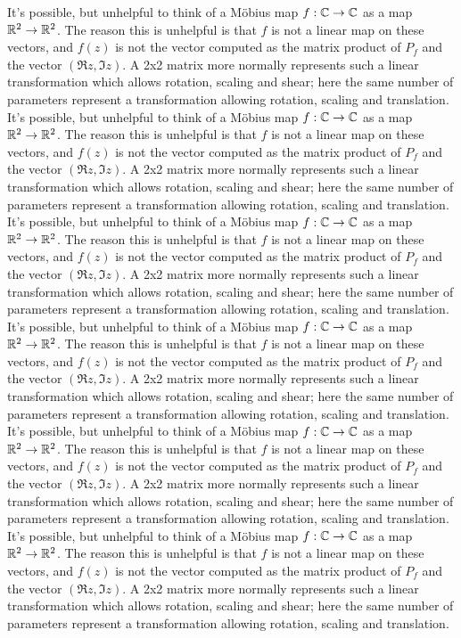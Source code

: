 It's possible, but unhelpful to think of a M\"obius map $f:\mathbb{C}\rightarrow\mathbb{C}$ as a  map $\mathbb{R}^2\rightarrow\mathbb{R}^2$.  The reason this is unhelpful is that $f$ is not a linear map on these vectors, and $f(z)$ is not the vector computed as the matrix product of $P_f$ and the vector $(\Re{z},\Im{z})$. A 2x2 matrix more normally represents such a linear transformation which allows rotation, scaling and shear; here the same number of parameters represent a transformation allowing rotation, scaling and translation. 
It's possible, but unhelpful to think of a M\"obius map $f:\mathbb{C}\rightarrow\mathbb{C}$ as a  map $\mathbb{R}^2\rightarrow\mathbb{R}^2$.  The reason this is unhelpful is that $f$ is not a linear map on these vectors, and $f(z)$ is not the vector computed as the matrix product of $P_f$ and the vector $(\Re{z},\Im{z})$. A 2x2 matrix more normally represents such a linear transformation which allows rotation, scaling and shear; here the same number of parameters represent a transformation allowing rotation, scaling and translation. 
It's possible, but unhelpful to think of a M\"obius map $f:\mathbb{C}\rightarrow\mathbb{C}$ as a  map $\mathbb{R}^2\rightarrow\mathbb{R}^2$.  The reason this is unhelpful is that $f$ is not a linear map on these vectors, and $f(z)$ is not the vector computed as the matrix product of $P_f$ and the vector $(\Re{z},\Im{z})$. A 2x2 matrix more normally represents such a linear transformation which allows rotation, scaling and shear; here the same number of parameters represent a transformation allowing rotation, scaling and translation. 
It's possible, but unhelpful to think of a M\"obius map $f:\mathbb{C}\rightarrow\mathbb{C}$ as a  map $\mathbb{R}^2\rightarrow\mathbb{R}^2$.  The reason this is unhelpful is that $f$ is not a linear map on these vectors, and $f(z)$ is not the vector computed as the matrix product of $P_f$ and the vector $(\Re{z},\Im{z})$. A 2x2 matrix more normally represents such a linear transformation which allows rotation, scaling and shear; here the same number of parameters represent a transformation allowing rotation, scaling and translation. 
It's possible, but unhelpful to think of a M\"obius map $f:\mathbb{C}\rightarrow\mathbb{C}$ as a  map $\mathbb{R}^2\rightarrow\mathbb{R}^2$.  The reason this is unhelpful is that $f$ is not a linear map on these vectors, and $f(z)$ is not the vector computed as the matrix product of $P_f$ and the vector $(\Re{z},\Im{z})$. A 2x2 matrix more normally represents such a linear transformation which allows rotation, scaling and shear; here the same number of parameters represent a transformation allowing rotation, scaling and translation. 
It's possible, but unhelpful to think of a M\"obius map $f:\mathbb{C}\rightarrow\mathbb{C}$ as a  map $\mathbb{R}^2\rightarrow\mathbb{R}^2$.  The reason this is unhelpful is that $f$ is not a linear map on these vectors, and $f(z)$ is not the vector computed as the matrix product of $P_f$ and the vector $(\Re{z},\Im{z})$. A 2x2 matrix more normally represents such a linear transformation which allows rotation, scaling and shear; here the same number of parameters represent a transformation allowing rotation, scaling and translation. 
